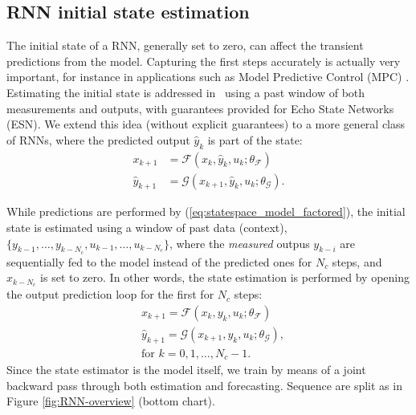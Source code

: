 \documentclass{article}
\newcommand{\F}{\mathcal{F}}
\newcommand{\G}{\mathcal{G}}
\begin{document}
\subsection{RNN initial state estimation}
\label{OpenLSTM}
The initial state of a RNN, generally set to zero, can affect the transient predictions from the model. Capturing the first steps accurately is actually very important, for instance in applications such as Model Predictive Control (MPC) \cite{Maciejowski_book}.   Estimating the initial state is addressed in~\cite{Armenio2019} using  a past window of both measurements and outputs, with guarantees provided for Echo State Networks (ESN). We extend this idea (without explicit guarantees) to a more general class of RNNs, where the predicted output $\hat{y}_k$ is part of the state:  
\begin{subequations}
\label{eq:statespace_model_factored}
\begin{align}
    x_{k+1} &=  {\F}(x_k, \hat{y}_k, u_k; \theta_\F)\\
    \hat{y}_{k+1}   &= {\G}(x_{k+1}, \hat{y}_k, u_k; \theta_\G).
\end{align}
\end{subequations} 




While predictions are performed by (\ref{eq:statespace_model_factored}),  the initial state is estimated using a window of past data (context), $\{y_{k-1},\dots,y_{k-N_c}, u_{k-1},\dots, u_{k-N_c}\}$, where the \emph{measured} outpus $y_{k-i}$ are sequentially fed to the model instead of the predicted ones for $N_c$ steps,  and $x_{k-N_c}$ is set to zero. In other words, the state estimation is performed by opening the output prediction loop for the first for $N_c$ steps:
\begin{subequations}
\label{eq:statespace_model_estimator}
\begin{align}
    & x_{k+1} =  {\F}(x_k, y_k, u_k; \theta_\F)\\
    & \hat{y}_{k+1}   = {\G}(x_{k+1}, {y}_k, u_k; \theta_\G),\\
    &\text{for $k=0,1,\dots, N_c\!-\!1$.}
\end{align}
\end{subequations} 
Since the state estimator is the model itself, we train by means of a joint backward pass through both estimation and forecasting. Sequence are split as in Figure \ref{fig:RNN-overview} (bottom chart). 
\end{document}
